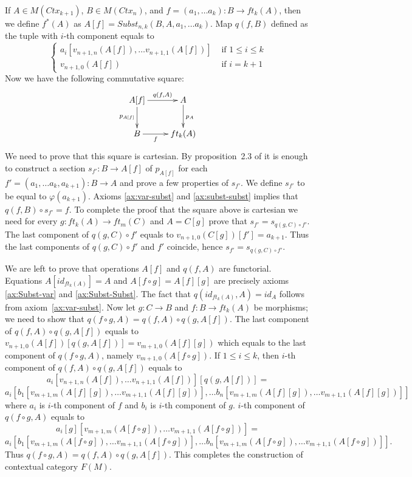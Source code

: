 \documentclass{amsart}
\theoremstyle{definition}
\theoremstyle{remark}
\numberwithin{figure}{section}
\begin{document}
If $A \in M(Ctx_{k+1})$, $B \in M(Ctx_n)$, and $f = (a_1, \ldots a_k) : B \to ft_k(A)$, then we define $f^*(A)$ as $A[f] = Subst_{n,k}(B, A, a_1, \ldots a_k)$.
Map $q(f,B)$ defined as the tuple with $i$-th component equals to
\[ \left\{
  \begin{array}{lr}
    a_i[v_{n+1,n}(A[f]), \ldots v_{n+1,1}(A[f])] & \text{ if } 1 \leq i \leq k \\
    v_{n+1,0}(A[f])                              & \text{ if } i = k+1
  \end{array}
\right. \]
Now we have the following commutative square:
\[ \xymatrix{ A[f] \ar[r]^-{q(f,A)} \ar[d]_{p_{A[f]}} & A \ar[d]^{p_A} \\
              B \ar[r]_-f                             & ft_k(A)
            } \]
We need to prove that this square is cartesian.
By proposition~2.3 of \cite{c-systems} it is enough to construct a section $s_{f'} : B \to A[f]$ of $p_{A[f]}$ for each $f' = (a_1, \ldots a_k, a_{k+1}) : B \to A$ and prove a few properties of $s_{f'}$.
We define $s_{f'}$ to be equal to $\varphi(a_{k+1})$.
Axioms \eqref{ax:var-subst} and \eqref{ax:subst-subst} implies that $q(f, B) \circ s_{f'} = f$.
To complete the proof that the square above is cartesian we need for every $g : ft_k(A) \to ft_m(C)$ and $A = C[g]$ prove that $s_{f'} = s_{q(g,C) \circ f'}$.
The last component of $q(g,C) \circ f'$ equals to $v_{n+1,0}(C[g])[f'] = a_{k+1}$.
Thus the last components of $q(g,C) \circ f'$ and $f'$ coincide, hence $s_{f'} = s_{q(g,C) \circ f'}$.

We are left to prove that operations $A[f]$ and $q(f,A)$ are functorial.
Equations $A[id_{ft_k(A)}] = A$ and $A[f \circ g] = A[f][g]$ are precisely axioms \eqref{ax:Subst-var} and \eqref{ax:Subst-Subst}.
The fact that $q(id_{ft_k(A)}, A) = id_A$ follows from axiom~\ref{ax:var-subst}.
Now let $g : C \to B$ and $f : B \to ft_k(A)$ be morphisms; we need to show that $q(f \circ g, A) = q(f,A) \circ q(g,A[f])$.
The last component of $q(f,A) \circ q(g,A[f])$ equals to $v_{n+1,0}(A[f])[q(g,A[f])] = v_{m+1,0}(A[f][g])$ which equals to the last component of $q(f \circ g, A)$, namely $v_{m+1,0}(A[f \circ g])$.
If $1 \leq i \leq k$, then $i$-th component of $q(f,A) \circ q(g,A[f])$ equals to
\[ a_i[v_{n+1,n}(A[f]), \ldots v_{n+1,1}(A[f])][q(g,A[f])] = \]
\[ a_i[b_1[v_{m+1,m}(A[f][g]), \ldots v_{m+1,1}(A[f][g])], \ldots b_n[v_{m+1,m}(A[f][g]), \ldots v_{m+1,1}(A[f][g])]] \]
where $a_i$ is $i$-th component of $f$ and $b_i$ is $i$-th component of $g$.
$i$-th component of $q(f \circ g, A)$ equals to
\[ a_i[g][v_{m+1,m}(A[f \circ g]), \ldots v_{m+1,1}(A[f \circ g])] = \]
\[ a_i[b_1[v_{m+1,m}(A[f \circ g]), \ldots v_{m+1,1}(A[f \circ g])], \ldots b_n[v_{m+1,m}(A[f \circ g]), \ldots v_{m+1,1}(A[f \circ g])]]. \]
Thus $q(f \circ g, A) = q(f,A) \circ q(g,A[f])$.
This completes the construction of contextual category $F(M)$.
\end{document}
